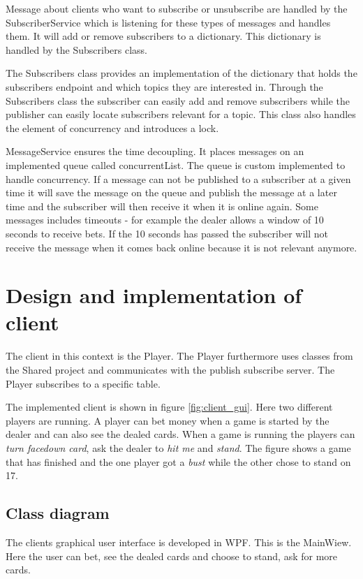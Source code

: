 Message about clients who want to subscribe or unsubscribe are handled by the SubscriberService which is listening for these types of messages and handles them. It will add  or remove subscribers to a dictionary. This dictionary is handled by the Subscribers class.

The Subscribers class provides an implementation of the dictionary that holds the subscribers endpoint and which topics they are interested in. Through the Subscribers class the subscriber can easily add and remove subscribers while the publisher can easily locate subscribers relevant for a topic. This class also handles the element of concurrency and introduces a lock.

MessageService ensures the time decoupling. It places messages on an implemented queue called concurrentList. The queue is custom implemented to handle concurrency. If a message can not be published to a subscriber at a given time it will save the message on the queue and publish the message at a later time and the subscriber will then receive it when it is online again. Some messages includes timeouts - for example the dealer allows a window of 10 seconds to receive bets. If the 10 seconds has passed the subscriber will not receive the message when it comes back online because it is not relevant anymore.
\FloatBarrier

\section{Design and implementation of client}
The client in this context is the Player. The Player furthermore uses classes from the Shared project and communicates with the publish subscribe server. The Player subscribes to a specific table.


The implemented client is shown in figure \ref{fig:client_gui}. Here two different players are running. A player can bet money when a game is started by the dealer and can also see the dealed cards. When a game is running the players can \emph{turn facedown card}, ask the dealer to \emph{hit me} and \emph{stand}. The figure shows a game that has finished and the one player got a \emph{bust} while the other chose to stand on 17.
\FloatBarrier


\subsection{Class diagram}
The clients graphical user interface is developed in WPF. This is the MainWiew. Here the user can bet, see the dealed cards and choose to stand, ask for more cards. 

